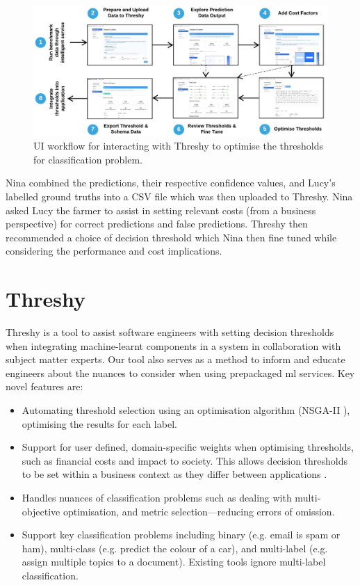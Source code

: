 \begin{figure}[t!]
    \centering
    \includegraphics[width=\linewidth]{workflow}
    \caption[UI workflow of Threshy]{UI workflow for interacting with Threshy to optimise the thresholds for classification problem.}
    \label{fse-demo2020:fig:workflow}
\end{figure}

Nina combined the predictions, their respective confidence values, and Lucy's labelled ground truths into a CSV file which was then uploaded to Threshy. Nina asked Lucy the farmer to assist in setting relevant costs (from a business perspective) for correct predictions and false predictions. Threshy then recommended a choice of decision threshold which Nina then fine tuned while considering the performance and cost implications. 

\section{Threshy}
\label{fse-demo2020:sec:threshy}

Threshy is a tool to assist software engineers with setting decision thresholds when integrating machine-learnt components in a system in collaboration with subject matter experts. Our tool also serves as a method to inform and educate engineers about the nuances to consider when using prepackaged \gls{ml} services. Key novel features are:

\begin{itemize}
    \item Automating threshold selection using an optimisation algorithm (NSGA-II \citep{996017}), optimising the results for each label. 
    \item Support for user defined, domain-specific weights when optimising thresholds, such as financial costs and impact to society. This allows decision thresholds to be set within a business context as they differ between applications \citep{Drummond2006}. 
    \item Handles nuances of classification problems such as dealing with multi-objective optimisation, and metric selection---reducing errors of omission.
    \item Support key classification problems including binary (e.g. email is spam or ham), multi-class (e.g. predict the colour of a car), and multi-label (e.g. assign multiple topics to a document). Existing tools ignore multi-label classification.
\end{itemize}

